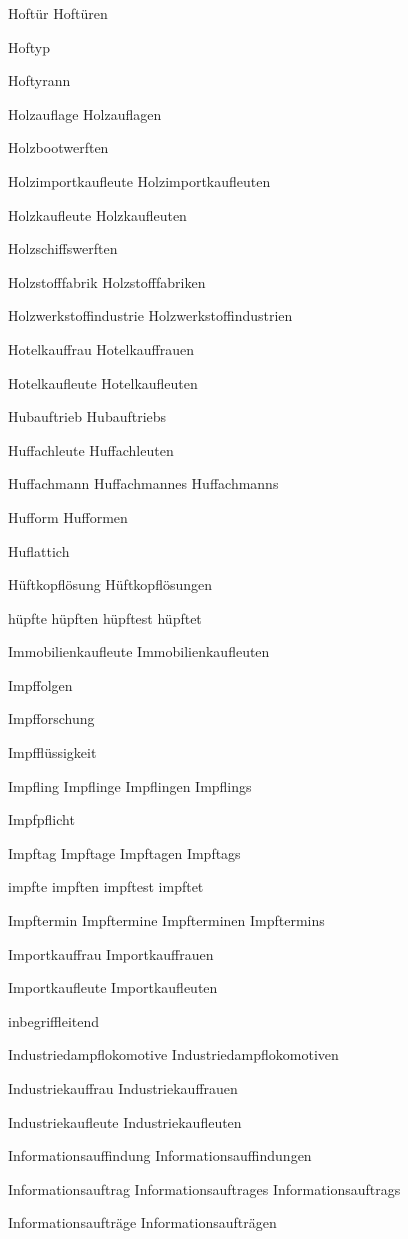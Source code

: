 Hoftür
Hoftüren

Hoftyp

Hoftyrann

Holzauflage
Holzauflagen

Holzbootwerften

Holzimportkaufleute
Holzimportkaufleuten

Holzkaufleute
Holzkaufleuten

Holzschiffswerften

Holzstofffabrik
Holzstofffabriken

Holzwerkstoffindustrie
Holzwerkstoffindustrien

Hotelkauffrau
Hotelkauffrauen

Hotelkaufleute
Hotelkaufleuten

Hubauftrieb
Hubauftriebs

Huffachleute
Huffachleuten

Huffachmann
Huffachmannes
Huffachmanns

Hufform
Hufformen

Huflattich

Hüftkopflösung
Hüftkopflösungen

hüpfte
hüpften
hüpftest
hüpftet

Immobilienkaufleute
Immobilienkaufleuten

Impffolgen

Impfforschung

Impfflüssigkeit

Impfling
Impflinge
Impflingen
Impflings

Impfpflicht

Impftag
Impftage
Impftagen
Impftags

impfte
impften
impftest
impftet

Impftermin
Impftermine
Impfterminen
Impftermins

Importkauffrau
Importkauffrauen

Importkaufleute
Importkaufleuten

inbegriffleitend

Industriedampflokomotive
Industriedampflokomotiven

Industriekauffrau
Industriekauffrauen

Industriekaufleute
Industriekaufleuten

Informationsauffindung
Informationsauffindungen

Informationsauftrag
Informationsauftrages
Informationsauftrags

Informationsaufträge
Informationsaufträgen

